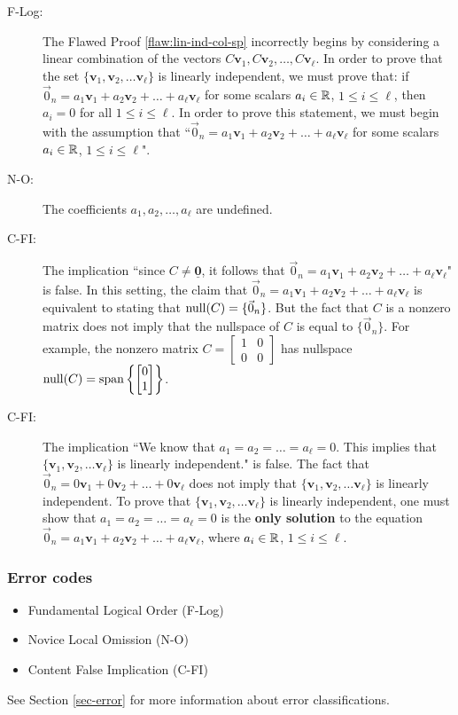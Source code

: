 \begin{description}
	\item[F-Log:] The Flawed Proof \ref{flaw:lin-ind-col-sp} incorrectly begins by considering a linear combination of the vectors  $C\bm{v}_1,C\bm{v}_2,\ldots, C\bm{v}_\ell$.  In order to prove that the set $\{\bm{v}_1, \bm{v}_2,\ldots \bm{v}_\ell\}$ is linearly independent, we must prove that: if $\vec{0}_n = a_1\bm{v}_1 + a_2\bm{v}_2 + \ldots + a_\ell\bm{v}_\ell$ for some scalars $a_i \in \mathbb R$, $1\leq i \leq \ell$, then $a_i = 0$ for all $1\leq i \leq \ell$.  In order to prove this statement, we must begin with the assumption that ``$\vec{0}_n = a_1\bm{v}_1 + a_2\bm{v}_2 + \ldots + a_\ell\bm{v}_\ell$ for some scalars $a_i \in \mathbb R$, $1 \leq i \leq \ell$".
		\item[N-O:] The coefficients $a_1, a_2, \ldots, a_\ell$ are undefined.

	\item[C-FI:] The implication ``since $C\neq \underline{\bm{0}}$, it follows that $\vec{0}_n = a_1\bm{v}_1 + a_2\bm{v}_2 + \ldots + a_\ell\bm{v}_\ell$" is false.  In this setting, the claim that $\vec{0}_n = a_1\bm{v}_1 + a_2\bm{v}_2 + \ldots + a_\ell\bm{v}_\ell$ is equivalent to stating that $\operatorname{null}(C) = \{\vec{0}_n\}$. But the fact that $C$ is a nonzero matrix does not imply that the nullspace of $C$ is equal to $\{\vec{0}_n\}$. For example, the nonzero matrix $C = \begin{bmatrix} 1 & 0 \\ 0 & 0 \end{bmatrix}$ has nullspace $\operatorname{null}(C) = \operatorname{span} \left \{ \begin{bmatrix} 0 \\ 1 \end{bmatrix} \right \}$.
	\item[C-FI:] The implication ``We know that $a_1 = a_2 = \ldots = a_\ell = 0$.  This implies that $\{\bm{v}_1, \bm{v}_2,\ldots \bm{v}_\ell\}$ is linearly independent." is false.  The fact that $\vec{0}_n = 0\bm{v}_1 + 0\bm{v}_2 + \ldots + 0\bm{v}_\ell$ does not imply that $\{\bm{v}_1, \bm{v}_2,\ldots \bm{v}_\ell\}$ is linearly independent. To prove that $\{\bm{v}_1, \bm{v}_2,\ldots \bm{v}_\ell\}$ is linearly independent, one must show that $a_1 = a_2 = \ldots = a_\ell = 0$ is the \textbf{only solution} to the equation $\vec{0}_n = a_1\bm{v}_1 + a_2\bm{v}_2 + \ldots + a_\ell\bm{v}_\ell$, where $a_i \in \mathbb R$, $1\leq i \leq \ell$.
\end{description}

\subsubsection{Error codes}
\begin{itemize}
	\item 	Fundamental Logical Order (F-Log)
	\item 	Novice Local Omission (N-O)
	\item   Content False Implication (C-FI)
\end{itemize}
See Section \ref{sec-error} for more information about error classifications.


